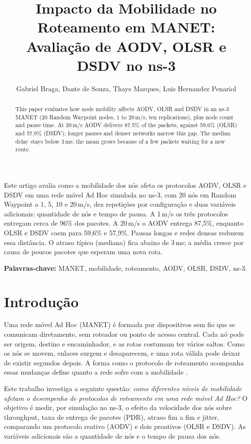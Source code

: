 \documentclass[12pt]{article}
\title{Impacto da Mobilidade no Roteamento em MANET:\\ Avaliação de AODV, OLSR e DSDV no ns-3}
\author{Gabriel Braga\inst{1}, Dante de Souza\inst{1}, Thays Marques\inst{1},
  Luis Hernandez Penariol\inst{1}}
\begin{document}
\maketitle

\begin{abstract}
  This paper evaluates how node mobility affects AODV, OLSR and DSDV in an ns-3 MANET
  (20 Random Waypoint nodes, 1 to 20\,m/s, ten replications), plus node count and pause
  time. At 20\,m/s AODV delivers 87.5\% of the packets, against 59.6\% (OLSR) and 57.9\%
  (DSDV); longer pauses and denser networks narrow this gap. The median delay stays below
  3\,ms; the mean grows because of a few packets waiting for a new route.
\end{abstract}

\begin{resumo}
  Este artigo avalia como a mobilidade dos nós afeta os protocolos AODV, OLSR e DSDV em
  uma rede móvel Ad Hoc simulada no ns-3, com 20 nós em Random Waypoint a 1, 5, 10 e
  20\,m/s, dez repetições por configuração e duas variáveis adicionais: quantidade de nós e
  tempo de pausa. A 1\,m/s os três protocolos entregam cerca de 96\% dos pacotes. A
  20\,m/s o AODV entrega 87,5\%, enquanto OLSR e DSDV caem para 59,6\% e 57,9\%. Pausas
  longas e redes densas reduzem essa distância. O atraso típico (mediana) fica abaixo de
  3\,ms; a média cresce por causa de poucos pacotes que esperam uma nova rota.

  \noindent\textbf{Palavras-chave:} MANET, mobilidade, roteamento, AODV, OLSR, DSDV, ns-3.
\end{resumo}

\section{Introdução}

Uma rede móvel Ad Hoc (MANET) é formada por dispositivos sem fio que se comunicam
diretamente, sem roteador ou ponto de acesso central. Cada nó pode ser origem, destino e
encaminhador, e as rotas costumam ter vários saltos. Como os nós se movem, enlaces surgem
e desaparecem, e uma rota válida pode deixar de existir segundos depois. A forma como o
protocolo de roteamento acompanha essas mudanças define quanto a rede sofre com a
mobilidade \cite{broch1998}.

Este trabalho investiga a seguinte questão: \emph{como diferentes níveis de mobilidade
afetam o desempenho de protocolos de roteamento em uma rede móvel Ad Hoc?} O objetivo é
medir, por simulação no ns-3, o efeito da velocidade dos nós sobre throughput, taxa de
entrega de pacotes (PDR), atraso fim a fim e jitter, comparando um protocolo reativo
(AODV) e dois proativos (OLSR e DSDV). As variáveis adicionais são a quantidade de nós e o
tempo de pausa dos nós.
\end{document}
